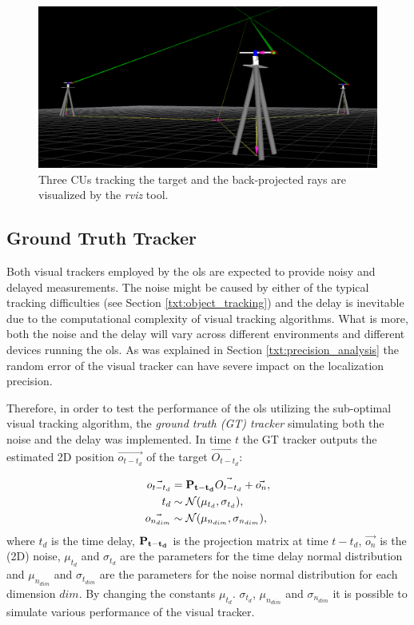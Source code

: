\begin{figure}[htb]
	\centering
	\includegraphics[width=0.65\linewidth]{fig/rviz.png}
	\caption{Three CUs tracking the target and the back-projected rays are visualized by the \textit{rviz} tool.}
	\label{fig:rviz}
\end{figure}

\subsection{Ground Truth Tracker} \label{txt:ground_truth_tracker}

Both visual trackers employed by the \gls{ols} are expected to provide noisy and delayed measurements. The noise might be caused by either of the typical tracking difficulties (see Section \ref{txt:object_tracking}) and the delay is inevitable due to the computational complexity of visual tracking algorithms. What is more, both the noise and the delay will vary across different environments and different devices running the \gls{ols}. As was explained in Section \ref{txt:precision_analysis} the random error of the visual tracker can have severe impact on the localization precision.

Therefore, in order to test the performance of the \gls{ols} utilizing the sub-optimal visual tracking algorithm, the \textit{ground truth (GT) tracker} simulating both the noise and the delay was implemented. In time $t$ the GT tracker outputs the estimated 2D position $\vec{o_{t-t_{d}}}$ of the target $\vec{O_{t-t_{d}}}$:

\begin{align}
\vec{o_{t-t_{d}}} &= \mathbf{P_{t-t_{d}}}\vec{O_{t-t_{d}}} + \vec{o_{n}},\\ 
t_{d} &\sim \mathcal{N}(\mu_{t_{d}}, \sigma_{t_{d}}),\\
\vec{o_{n_{dim}}} &\sim \mathcal{N}(\mu_{n_{dim}}, \sigma_{n_{dim}}),
\end{align}
where $t_{d}$ is the time delay, $\mathbf{P_{t-t_{d}}}$ is the projection matrix at time $t-t_{d}$, $\vec{o_{n}}$ is the (2D) noise, $\mu_{t_{d}}$ and $\sigma_{t_{d}}$ are the parameters for the time delay normal distribution and $\mu_{n_{dim}}$ and $\sigma_{t_{dim}}$ are the parameters for the noise normal distribution for each dimension $dim$. By changing the constants $\mu_{t_{d}}$. $\sigma_{t_{d}}$, $\mu_{n_{dim}}$ and $\sigma_{n_{dim}}$ it is possible to simulate various performance of the visual tracker.

